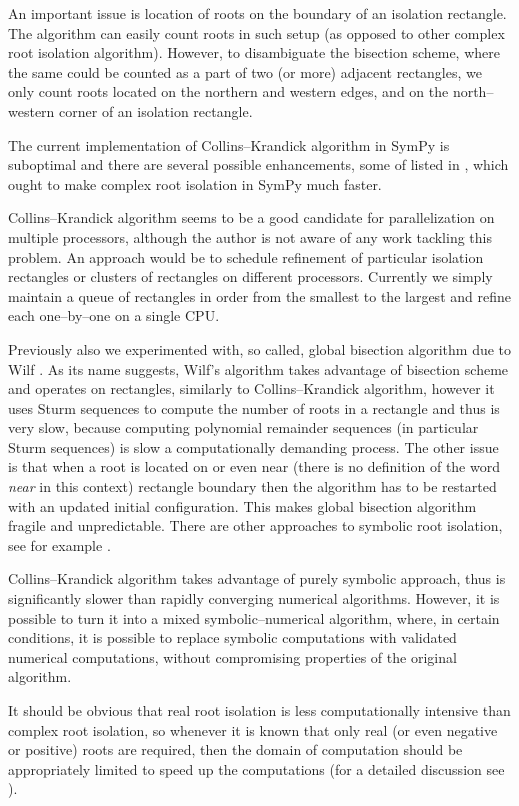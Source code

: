 An important issue is location of roots on the boundary of an isolation rectangle. The
algorithm can easily count roots in such setup (as opposed to other complex root isolation
algorithm). However, to disambiguate the bisection scheme, where the same could be counted
as a part of two (or more) adjacent rectangles, we only count roots located on the northern
and western edges, and on the north--western corner of an isolation rectangle.

The current implementation of Collins--Krandick algorithm in SymPy is suboptimal and there
are several possible enhancements, some of listed in \cite{Collins1992infallible}, which ought
to make complex root isolation in SymPy much faster.

Collins--Krandick algorithm seems to be a good candidate for parallelization on multiple
processors, although the author is not aware of any work tackling this problem. An approach
would be to schedule refinement of particular isolation rectangles or clusters of rectangles
on different processors. Currently we simply maintain a queue of rectangles in order from
the smallest to the largest and refine each one--by--one on a single CPU.

Previously also we experimented with, so called, global bisection algorithm due to Wilf
\cite{Wilf1978bisection}. As its name suggests, Wilf's algorithm takes advantage of bisection
scheme and operates on rectangles, similarly to Collins--Krandick algorithm, however it uses
Sturm sequences to compute the number of roots in a rectangle and thus is very slow, because
computing polynomial remainder sequences (in particular Sturm sequences) is slow a computationally
demanding process. The other issue is that when a root is located on or even near (there is no
definition of the word \emph{near} in this context) rectangle boundary then the algorithm has to be
restarted with an updated initial configuration. This makes global bisection algorithm fragile
and unpredictable. There are other approaches to symbolic root isolation, see for example
\cite{Pinkert1976complex}.

Collins--Krandick algorithm takes advantage of purely symbolic approach, thus is significantly
slower than rapidly converging numerical algorithms. However, it is possible to turn it into a
mixed symbolic--numerical algorithm, where, in certain conditions, it is possible to replace
symbolic computations with validated numerical computations, without compromising properties
of the original algorithm.

It should be obvious that real root isolation is less computationally intensive than complex
root isolation, so whenever it is known that only real (or even negative or positive) roots
are required, then the domain of computation should be appropriately limited to speed up the
computations (for a detailed discussion see \cite{Collins1996complex}).


